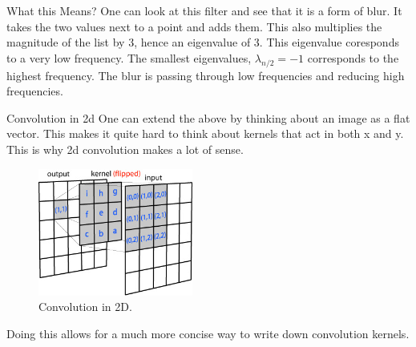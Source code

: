 \documentclass{beamer}
\begin{document}
\begin{frame}{What this Means?}
One can look at this filter and see that it is a form of blur. It takes the two values next to a point and adds them.  This also multiplies the magnitude of the list by 3, hence an eigenvalue of 3. This eigenvalue coresponds to a very low frequency. The smallest eigenvalues, $\lambda_{n/2} = -1$ corresponds to the highest frequency. The blur is passing through low frequencies and reducing high frequencies.
\end{frame}

\begin{frame}{Convolution in 2d}
One can extend the above by thinking about an image as a flat vector. This makes it quite hard to think about kernels that act in both x and y. This is why 2d convolution makes a lot of sense.
\begin{figure}[htp]
\centering
\includegraphics[width=2in]{conv2d_matrix.jpg}
\caption{Convolution in 2D.}
\label{}
\end{figure}
Doing this allows for a much more concise way to write down convolution kernels.
\end{frame}
\end{document}

